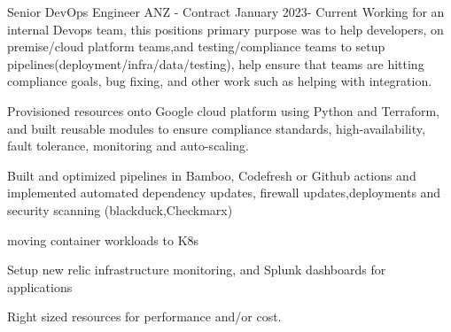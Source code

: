 
\begin{cventries}

  \cventryextended
  {Senior DevOps Engineer} %
  {ANZ - Contract} %
  {} %
  {January 2023- Current} %
  {Working for an internal Devops team, this positions primary purpose was to
    help developers, on premise/cloud platform teams,and testing/compliance
    teams to
    setup pipelines(deployment/infra/data/testing), help ensure that teams are
    hitting compliance goals, bug fixing, and other work such as helping with
    integration.  }
  {
    \begin{cvitems} %
      \item {Provisioned resources onto Google cloud platform using Python
                  and Terraform, and built reusable modules to ensure
                  compliance standards,
                  high-availability, fault tolerance, monitoring and
                  auto-scaling.}
      \item {Built and optimized pipelines in Bamboo, Codefresh or
                  Github actions
                  and implemented automated dependency updates, firewall
                  updates,deployments and security scanning
                  (blackduck,Checkmarx)}
      \item { moving container workloads to K8s}
      \item {Setup new relic infrastructure monitoring, and Splunk dashboards
                  for applications  }
      \item {Right sized resources for performance and/or cost.}
    \end{cvitems}
  }


\end{cventries}
